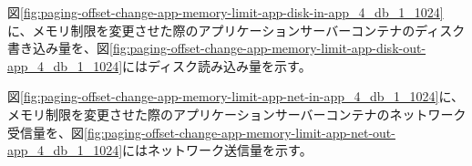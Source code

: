 \documentclass[../../../../main]{subfiles}
\begin{document}

    図\ref{fig:paging-offset-change-app-memory-limit-app-disk-in-app_4_db_1_1024}に、メモリ制限を変更させた際のアプリケーションサーバーコンテナのディスク書き込み量を、図\ref{fig:paging-offset-change-app-memory-limit-app-disk-out-app_4_db_1_1024}にはディスク読み込み量を示す。

    
    


    図\ref{fig:paging-offset-change-app-memory-limit-app-net-in-app_4_db_1_1024}に、メモリ制限を変更させた際のアプリケーションサーバーコンテナのネットワーク受信量を、図\ref{fig:paging-offset-change-app-memory-limit-app-net-out-app_4_db_1_1024}にはネットワーク送信量を示す。

    
    
\end{document}
